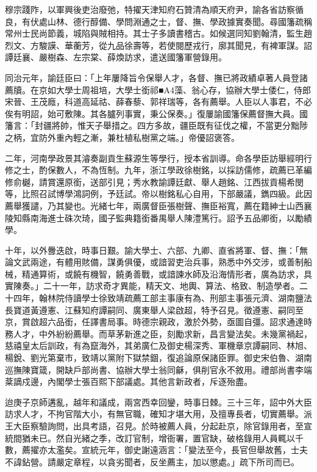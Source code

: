 \begin{pinyinscope}
穆宗踐阼，以軍興後吏治廢弛，特擢天津知府石贊清為順天府尹，諭各省訪察循良，有伏處山林、德行醇備、學問淵通之士，督、撫、學政據實奏聞。尋國籓疏稱常州士民尚節義，城陷與賊相持。其士子多讀書稽古。如候選同知劉翰清，監生趙烈文、方駿謨、華蘅芳，從九品徐壽等，若使閱歷戎行，廓其聞見，有裨軍謀。詔譚廷襄、嚴樹森、左宗棠、薛煥訪求，遣送國籓軍營錄用。

同治元年，諭廷臣曰：「上年屢降旨令保舉人才，各督、撫已將政績卓著人員登諸薦牘。在京如大學士周祖培，大學士銜祁■A4藻、翁心存，協辦大學士倭仁，侍郎宋晉、王茂廕，科道高延祜、薛春藜、郭祥瑞等，各有薦舉。人臣以人事君，不必俟有明詔，始可敷陳。其各臚列事實，秉公保奏。」復屢諭國籓保薦督撫大員。國籓言：「封疆將帥，惟天子舉措之。四方多故，疆臣既有征伐之權，不當更分黜陟之柄，宜防外重內輕之漸，兼杜植私樹黨之端。」帝優詔褒答。

二年，河南學政景其濬奏副貢生蘇源生等學行，授本省訓導。命各學臣訪舉經明行修之士，酌保數人，不為恆制。九年，浙江學政徐樹銘，以採訪儒修，疏薦已革編修俞樾，請賞還原銜，送部引見；秀水教諭譚廷獻、舉人趙銘、江西拔貢楊希閔等，比照召試博學鴻詞例，予廷試。帝以樹銘私心自用，下部嚴議，鐫四級。此因薦舉獲譴，乃其變也。光緒七年，兩廣督臣張樹聲、撫臣裕寬，薦在籍紳士山西襄陵知縣南海進士硃次琦，國子監典籍銜番禺舉人陳澧篤行。詔予五品卿銜，以勵績學。

十年，以外釁迭啟，時事日艱。諭大學士、六部、九卿、直省將軍、督、撫：「無論文武兩途，有體用賅備，謀勇俱優，或諳習吏治兵事，熟悉中外交涉，或善制船械，精通算術，或饒有機智，饒勇善戰，或諳諫水師及沿海情形者，廣為訪求，具實陳奏。」二十一年，訪求奇才異能，精天文、地輿、算法、格致、制造學者。二十四年，翰林院侍讀學士徐致靖疏薦工部主事康有為、刑部主事張元濟、湖南鹽法長寶道黃遵憲、江蘇知府譚嗣同、廣東舉人梁啟超，特予召見。徵遵憲、嗣同至京，賞啟超六品銜，任譯書局事。時德宗親政，激於外勢，亟圖自彊。詔求通達時務人才，中外紛紛薦舉。而草茅新進之臣，刻勵求新，昌言變法矣。未幾黨禍起，慈禧皇太后訓政，有為竄海外，其弟廣仁及御史楊深秀、軍機章京譚嗣同、林旭、楊銳、劉光第棄市，致靖以黨附下獄禁錮，復追論原保諸臣罪。御史宋伯魯、湖南巡撫陳寶箴，開缺戶部尚書、協辦大學士翁同龢，俱削官永不敘用。禮部尚書李端棻謫戍邊，內閣學士張百熙下部議處。其他言新政者，斥逐殆盡。

迨庚子京師遘亂，越年和議成，兩宮西幸回鑾，時事日棘。三十三年，詔中外大臣訪求人才，不拘官階大小，有無官職，確知才堪大用，及擅專長者，切實薦舉。派王大臣察驗詢問，出具考語，召見。於時被薦人員，分起赴京，除官錄用者，至宣統間猶未已。然自光緒之季，改訂官制，增衙署，置官缺，破格錄用人員輒以千數，薦擢亦太濫矣。宣統元年，御史謝遠涵言：「變法至今，長官但舉故舊，士夫不諱鉆營。請嚴定章程，以貪劣聞者，反坐薦主，加以懲處。」疏下所司而已。


\end{pinyinscope}

